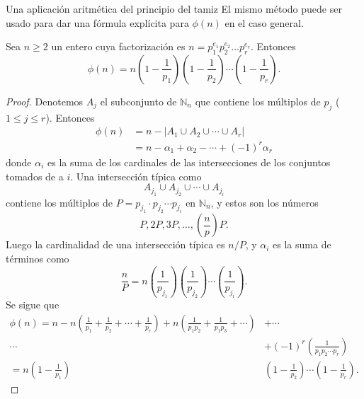 \begin{section}{Una aplicación aritmética del principio del
tamiz}
El mismo método puede ser usado para dar una fórmula explícita
para $\phi(n)$ en el caso general.


\begin{teorema}\label{tA2.2} Sea $n \ge 2$ un entero cuya factorización
es $n=p_1^{e_1}p_2^{e_2}\ldots p_r^{e_r}$. Entonces
$$
\phi(n)=n\left(1-\frac{1}{p_1}\right)\left(1-\frac{1}{p_2}\right)\cdots\left(1-\frac{1}{p_r}\right).
$$
\end{teorema}
\begin{proof} Denotemos $A_j$ el subconjunto de $\mathbb N_n$
que contiene los múltiplos de $p_j$ ($1\le j \le r$). Entonces
$$
\begin{aligned}
\phi(n) &= n- |A_1 \cup A_2 \cup \cdots \cup A_r| \\
       &= n -\alpha_1+ \alpha_2- \cdots +(-1)^r\alpha_r
\end{aligned}
$$
donde $\alpha_i$ es la suma de los cardinales de las
intersecciones de los conjuntos tomados de a $i$. Una intersección
típica como
$$
A_{j_1}\cup A_{j_2}\cup \cdots \cup A_{j_i}
$$
contiene los múltiplos de $P= p_{j_1}\cdot p_{j_2}\cdots p_{j_i}$ en $\mathbb N_n$, y estos son los números
$$
P,2P,3P,\ldots,\left(\frac{n}{p}\right)P.
$$
Luego la cardinalidad de una intersección típica es $n/P$, y
$\alpha_i$ es la suma de términos como
$$
\frac{n}{P}=
n\left(\frac{1}{p_{j_1}}\right)\left(\frac{1}{p_{j_2}}\right)\cdots
\left(\frac{1}{p_{j_i}}\right).
$$
Se sigue que
$$
\begin{aligned} \phi(n) = n - n\left(\frac{1}{p_1} + \frac{1}{p_2} +
\cdots +\frac{1}{p_r}\right) +n\left(\frac{1}{p_1p_2}
+ \frac{1}{p_1p_3}+\cdots\right) &+ \cdots \\
\cdots &+ (-1)^r \left(\frac{1}{p_1p_2 \cdots p_r}\right) \\
=n\left(1-\frac{1}{p_1}\right)&\left(1-\frac{1}{p_2}\right)\cdots\left(1-\frac{1}{p_r}\right).
\end{aligned}
$$
\end{proof}



\end{section}

